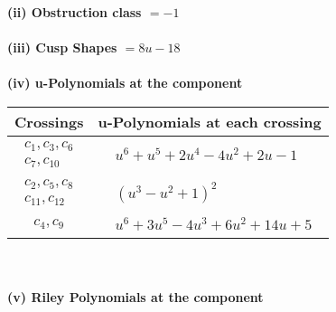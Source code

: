 \documentclass[1p]{elsarticle_modified}
\theoremstyle{definition}
\begin{document}
\flushleft \textbf{(ii) Obstruction class $= -1$}\\~\\
\flushleft \textbf{(iii) Cusp Shapes $= 8 u-18$}\\~\\
\newpage\renewcommand{\arraystretch}{1}
\flushleft \textbf{(iv) u-Polynomials at the component}\newline \\
\begin{tabular}{m{50pt}|m{274pt}}
Crossings & \hspace{64pt}u-Polynomials at each crossing \\
\hline $$\begin{aligned}c_{1},c_{3},c_{6}\\c_{7},c_{10}\end{aligned}$$&$\begin{aligned}
&u^6+u^5+2 u^4-4 u^2+2 u-1
\end{aligned}$\\
\hline $$\begin{aligned}c_{2},c_{5},c_{8}\\c_{11},c_{12}\end{aligned}$$&$\begin{aligned}
&(u^3- u^2+1)^2
\end{aligned}$\\
\hline $$\begin{aligned}c_{4},c_{9}\end{aligned}$$&$\begin{aligned}
&u^6+3 u^5-4 u^3+6 u^2+14 u+5
\end{aligned}$\\
\hline
\end{tabular}\\~\\
\newpage\renewcommand{\arraystretch}{1}
\flushleft \textbf{(v) Riley Polynomials at the component}\newline \\
\end{document}
